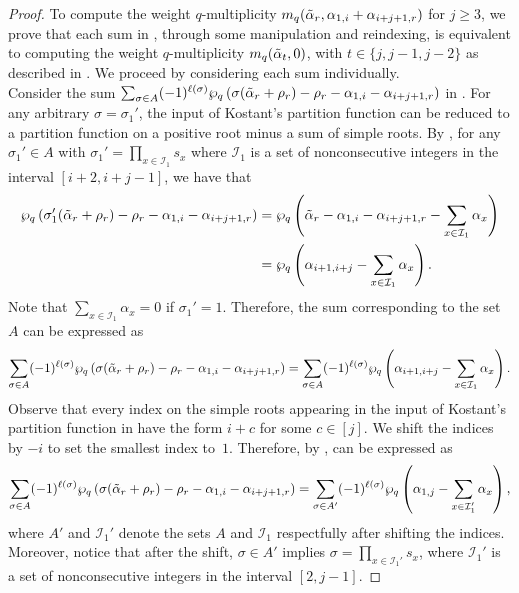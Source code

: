 \documentclass[10pt]{article}
\newcommand{\hr}[0]{\Tilde{\alpha}}
\newcommand{\qpartition}[1]{\wp_q\left(#1\right)}
\begin{document}
\begin{proof}
    To compute the weight $q$-multiplicity $m_q(\hr_r,\alpha_{1,i}+\alpha_{i+j+1,r})$ for $j\geq 3$, we prove that each sum in , through some manipulation and reindexing, is equivalent to computing the weight $q$-multiplicity $m_q(\hr_t,0)$, with $t\in\{j,j-1,j-2\}$ as described in .  We proceed by considering each sum individually. \\
    Consider the sum $\sum_{\sigma\in A} (-1)^{\ell(\sigma)}\qpartition{\sigma(\hr_r+\rho_r)-\rho_r-\alpha_{1,i}-\alpha_{i+j+1,r}}$ in . For any arbitrary $\sigma=\sigma_1'$, the input of Kostant's partition function can be reduced to a partition function on a positive root minus a sum of simple roots. By , for any $\sigma_1'\in A$ with $ \sigma_1'=\prod_{x\in\mathcal{I}_1}s_x$ where $\mathcal{I}_1$ is a set of nonconsecutive integers in the interval $[i+2,i+j-1]$, we have that
    \begin{align}
        \wp_q\left(\sigma_1'(\hr_r+\rho_r)-\rho_r-\alpha_{1,i}-\alpha_{i+j+1,r}\right) &=
        \wp_q\left(\hr_r - \alpha_{1,i} -\alpha_{i+j+1,r} - \sum_{x\in \mathcal{I}_1} \alpha_{x}\right)\notag \\
        &= \wp_q\left(\alpha_{i+1,i+j} - \sum_{x\in \mathcal{I}_1} \alpha_{x}\right).\notag
    \end{align}
    Note that $\sum_{x\in\mathcal{I}_1}\alpha_x=0$ if  $\sigma_1'=1$.  
    Therefore, the sum corresponding to the set $A$ can be expressed as
    \begin{align}
        \sum_{\sigma\in A} (-1)^{\ell(\sigma)}\qpartition{\sigma(\hr_r+\rho_r)-\rho_r-\alpha_{1,i}-\alpha_{i+j+1,r}} = \sum_{\sigma\in A}(-1)^{\ell(\sigma)}\qpartition{\alpha_{i+1,i+j}-\sum_{x\in\mathcal{I}_1}\alpha_x}\label{turn this into pamela result}.
    \end{align}
    Observe that every index on the simple roots appearing in the input of Kostant's partition function in  have the form $i+c$ for some $c\in [j]$. 
    We shift the indices by $-i$ to set the smallest index to~$1$. Therefore, by ,  can be expressed as
    \begin{equation}
        \sum_{\sigma\in A} (-1)^{\ell(\sigma)}\qpartition{\sigma(\hr_r+\rho_r)-\rho_r-\alpha_{1,i}-\alpha_{i+j+1,r}} = \sum_{\sigma\in A'} (-1)^{\ell(\sigma)}\qpartition{\alpha_{1,j}-\sum_{x\in\mathcal{I}'_1}\alpha_x},\label{match this with EQ1}
    \end{equation}
    where $A'$ and $\mathcal{I}_1'$ denote the sets $A$ and $\mathcal{I}_1$ respectfully after shifting the indices. Moreover, notice that after the shift, $\sigma\in A'$ implies $\sigma=\prod_{x\in\mathcal{I}_1'}s_x$, where $\mathcal{I}_1'$ is a set of nonconsecutive integers in the interval $[2,j-1]$.
    

\end{proof}
\end{document}
